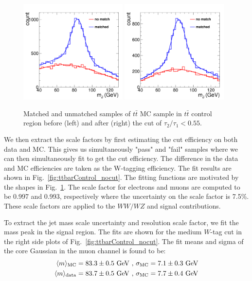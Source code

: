 \begin{figure}[htbp]
\centering
\includegraphics[width=0.48\textwidth]{figs/topwjes/GEN_all_nocut.pdf}
\includegraphics[width=0.48\textwidth]{figs/topwjes/GEN_all_cutT2T1.pdf}
\caption{Matched and unmatched samples of $t\bar{t}$ MC sample in $t\bar{t}$ control region before (left)
and after (right) the cut of $\tau_2/\tau_1<0.55$.}
\label{fig:genMatchTTbar}
\end{figure}

We then extract the scale factors by first estimating the cut efficiency on both data and MC.
This gives us simultaneously "pass" and "fail" samples where we can then simultaneously fit to get the cut efficiency.  
The difference in the data and MC efficiencies are taken as the W-tagging efficiency.
The fit results are shown in Fig.~\ref{fig:ttbarControl_nocut}.
The fitting functions are motivated by the shapes in Fig.~\ref{fig:genMatchTTbar}.
The scale factor for electrons and muons are computed to be 0.997 and 0.993, respectively where the uncertainty on the scale factor is 7.5\%.
These scale factors are applied to the $WW/WZ$ and signal contributions.  

To extract the jet mass scale uncertainty and resolution scale factor, we fit the mass peak in the signal region.  
The fits are shown for the medium $W$-tag cut in the right side plots of Fig.~\ref{fig:ttbarControl_nocut}.
The fit means and sigma of the core Gaussian in the muon channel is found to be:
\begin{eqnarray}
\langle m \rangle_{\rm MC} = 83.3 \pm 0.5~{\rm GeV}{\rm {~,~}}\sigma_{\rm MC} = 7.1 \pm 0.3~{\rm GeV} \\
\langle m \rangle_{\rm data} = 83.7 \pm 0.5~{\rm GeV}{\rm {~,~}}\sigma_{\rm MC} = 7.7 \pm 0.4~{\rm GeV} 
\end{eqnarray}

